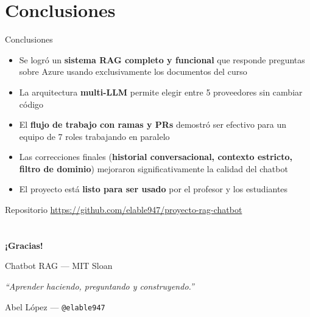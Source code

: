\documentclass[aspectratio=169, 11pt]{beamer}
\begin{document}
\section{Conclusiones}

\begin{frame}{Conclusiones}
\begin{itemize}
    \item Se logró un \textbf{sistema RAG completo y funcional} que responde preguntas sobre Azure usando exclusivamente los documentos del curso
    \item La arquitectura \textbf{multi-LLM} permite elegir entre 5 proveedores sin cambiar código
    \item El \textbf{flujo de trabajo con ramas y PRs} demostró ser efectivo para un equipo de 7 roles trabajando en paralelo
    \item Las correcciones finales (\textbf{historial conversacional, contexto estricto, filtro de dominio}) mejoraron significativamente la calidad del chatbot
    \item El proyecto está \textbf{listo para ser usado} por el profesor y los estudiantes
\end{itemize}

\vspace{0.5cm}
\begin{block}{Repositorio}
\centering
\url{https://github.com/elable947/proyecto-rag-chatbot}
\end{block}
\end{frame}

\section*{}

\begin{frame}
\centering
\vspace{1cm}
{\Huge \textbf{¡Gracias!}}
\vspace{0.5cm}

{\large Chatbot RAG --- MIT Sloan}

\vspace{0.3cm}
\textit{``Aprender haciendo, preguntando y construyendo.''}

\vspace{0.5cm}
\small Abel López --- \texttt{@elable947}
\end{frame}
\end{document}
